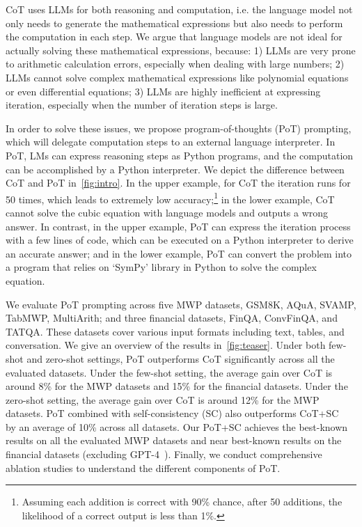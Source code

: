 CoT uses LLMs for both reasoning and computation, i.e. the language model not only needs to generate the mathematical expressions but also needs to perform the computation in each step. We argue that language models are not ideal for actually solving these mathematical expressions, because: 1) LLMs are very prone to arithmetic calculation errors, especially when dealing with large numbers; 2) LLMs cannot solve complex mathematical expressions like polynomial equations or even differential equations; 3) LLMs are highly inefficient at expressing iteration, especially when the number of iteration steps is large.

In order to solve these issues, we propose program-of-thoughts (PoT) prompting, which will delegate computation steps to an external language interpreter. In PoT, LMs can express reasoning steps as Python programs, and the computation can be accomplished by a Python interpreter. We depict the difference between CoT and PoT in~\autoref{fig:intro}. In the upper example, for CoT the iteration runs for 50 times, which leads to extremely low accuracy;\footnote{Assuming each addition is correct with 90\% chance, after 50 additions, the likelihood of a correct output is less than 1\%.}
in the lower example, CoT cannot solve the cubic equation with language models and outputs a wrong answer. In contrast, in the upper example, PoT can express the iteration process with a few lines of code, which can be executed on a Python interpreter to derive an accurate answer; and in the lower example, PoT can convert the problem into a program that relies on `SymPy' library  in Python to solve the complex equation. 

We evaluate PoT prompting across five MWP datasets, GSM8K, AQuA, SVAMP, TabMWP, MultiArith; and three financial datasets, FinQA, ConvFinQA, and TATQA. These datasets cover various input formats including text, tables, and conversation. We give an overview of the results in~\autoref{fig:teaser}. Under both few-shot and zero-shot settings, PoT outperforms CoT significantly across all the evaluated datasets. Under the few-shot setting, the average gain over CoT is around 8\% for the MWP datasets and 15\% for the financial datasets. Under the zero-shot setting, the average gain over CoT is around 12\% for the MWP datasets. PoT combined with self-consistency (SC) also outperforms CoT+SC~\citep{wang2022self} by an average of 10\% across all datasets. Our PoT+SC achieves the best-known results on all the evaluated MWP datasets and near best-known results on the financial datasets (excluding GPT-4~\citep{gpt4}). Finally, we conduct comprehensive ablation studies to understand the different components of PoT.

